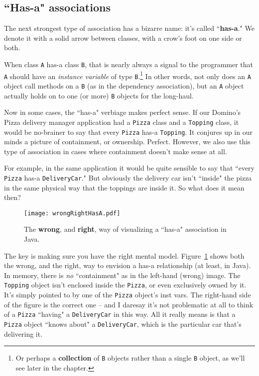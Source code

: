 \subsection{``Has-a" associations}

The next strongest type of association has a bizarre name: it's called
``\textbf{has-a}." We denote it with a solid arrow between classes, with a
crow's foot on one side or both.

When class \texttt{A} has-a class \texttt{B}, that is nearly always a signal
to the programmer that \texttt{A} should have an \textit{instance variable} of
type \texttt{B}.\footnote{Or perhaps a \textbf{collection} of \texttt{B}
objects rather than a single \texttt{B} object, as we'll see later in the
chapter.} In other words, not only does an \texttt{A} object call
methods on a \texttt{B} (as in the dependency association), but an \texttt{A}
object actually holds on to one (or more) \texttt{B} objects for the
long-haul.

Now in some cases, the ``has-a" verbiage makes perfect sense. If our Domino's
Pizza delivery manager application had a \texttt{Pizza} class and a
\texttt{Topping} class, it would be no-brainer to say that every
\texttt{Pizza} has-a \texttt{Topping}. It conjures up in our minds a picture
of containment, or ownership. Perfect. However, we also use this type of
association in cases where containment doesn't make sense at all.

For example, in the same application it would be quite sensible to say that
``every \texttt{Pizza} has-a \texttt{DeliveryCar}." But obviously the delivery
car isn't ``inside" the pizza in the same physical way that the toppings are
inside it. So what does it mean then?

\begin{figure}[ht]
\centering
\texttt{[image: wrongRightHasA.pdf]}   %
\caption{The \textbf{wrong}, and \textbf{right}, way of visualizing a ``has-a"
association in Java.}
\label{fig:wrongRightHasA}
\end{figure}

The key is making sure you have the right mental model.
Figure~\ref{fig:wrongRightHasA} shows both the wrong, and the right, way to
envision a has-a relationship (at least, in Java). In memory, there is
\textit{no} ``containment" as in the left-hand (wrong) image. The
\texttt{Topping} object isn't enclosed inside the \texttt{Pizza}, or even
exclusively owned by it. It's simply pointed to by one of the \texttt{Pizza}
object's inst vars. The right-hand side of the figure is the correct one --
and I daresay it's not problematic at all to think of a \texttt{Pizza}
``having" a \texttt{DeliveryCar} in this way. All it really means is that a
\texttt{Pizza} object ``knows about" a \texttt{DeliveryCar}, which is the
particular car that's delivering it.

